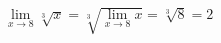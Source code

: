 \begin{ex}
\begin{align}
&\lim_{x\rightarrow 8} \sqrt[3]{x} = \sqrt[3]{\lim_{x\rightarrow 8} x} = \sqrt[3]{8} = 2\nonumber
\end{align}
\end{ex}